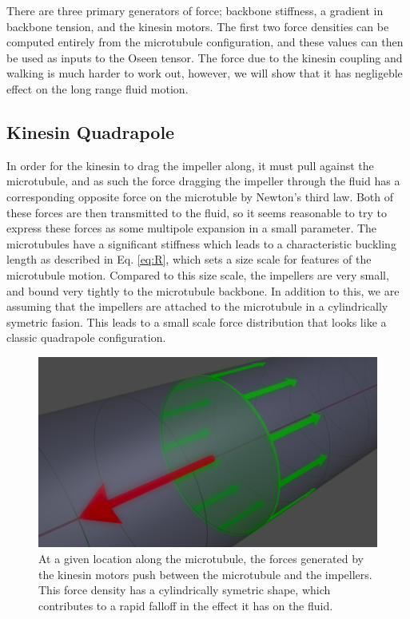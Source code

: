 \documentclass[11pt]{ucthesis}
\begin{document}
There are three primary generators of force; backbone stiffness, a gradient in backbone tension, and the kinesin motors. The first two force densities can be computed entirely from the microtubule configuration, and these values can then be used as inputs to the Oseen tensor.
The force due to the kinesin coupling and walking is much harder to work out, however, we will show that it has negligeble effect on the long range fluid motion.

\subsection{Kinesin Quadrapole}
In order for the kinesin to drag the impeller along, it must pull against the microtubule, and as such the force dragging the impeller through the fluid has a corresponding opposite force on the microtuble by Newton's third law. 
Both of these forces are then transmitted to the fluid, so it seems reasonable to try to express these forces as some multipole expansion in a small parameter.
The microtubules have a significant stiffness which leads to a characteristic buckling length as described in Eq. \ref{eq:R}, which sets a size scale for features of the microtubule motion. Compared to this size scale, the impellers are very small, and bound very tightly to the microtubule backbone. 
In addition to this, we are assuming that the impellers are attached to the microtubule in a cylindrically symetric fasion. This leads to a small scale force distribution that looks like a classic quadrapole configuration.

\begin{figure}[htp]
\begin{center}
\includegraphics[width=\hsize]{segforce.png}
\caption{ 
At a given location along the microtubule, the forces generated by the kinesin motors push between the microtubule and the impellers. This force density has a cylindrically symetric shape, which contributes to a rapid falloff in the effect it has on the fluid.
}
\label{fig:quadforce}
\end{center}
\end{figure}
\end{document}
